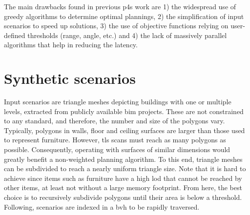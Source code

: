 The main drawbacks found in previous \acrshort{p4s} work are 1) the widespread use of greedy algorithms to determine optimal plannings, 2) the simplification of input scenarios to speed up solutions, 3) the use of objective functions relying on user-defined thresholds (range, angle, etc.) and 4) the lack of massively parallel algorithms that help in reducing the latency. 

\section{Synthetic scenarios}

Input scenarios are triangle meshes depicting buildings with one or multiple levels, extracted from publicly available \acrshort{bim} projects. These are not constrained to any standard, and therefore, the number and size of the polygons vary. Typically, polygons in walls, floor and ceiling surfaces are larger than those used to represent furniture. However, \acrshort{tls} scans must reach as many polygons as possible. Consequently, operating with surfaces of similar dimensions would greatly benefit a non-weighted planning algorithm. To this end, triangle meshes can be subdivided to reach a nearly uniform triangle size. Note that it is hard to achieve since items such as furniture have a high \acrshort{lod} that cannot be reached by other items, at least not without a large memory footprint. From here, the best choice is to recursively subdivide polygons until their area is below a threshold. Following, scenarios are indexed in a \acrshort{bvh} to be rapidly traversed.

